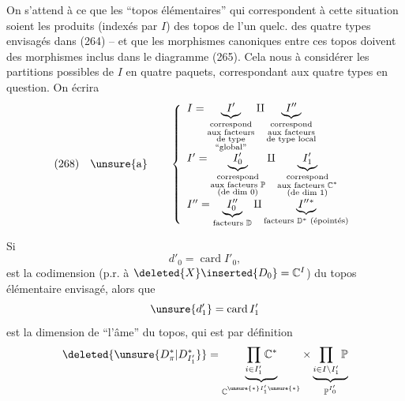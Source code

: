 On s'attend à ce que les ``topos élémentaires'' qui correspondent à cette situation soient les produits (indexés par $I$) des topos de l'un quelc. des quatre types envisagés dans (264) -- et que les morphismes canoniques entre ces topos doivent  des morphismes inclus dans le diagramme (265). Cela nous  à considérer les partitions possibles de $I$ en quatre paquets, correspondant aux quatre types en question. On écrira
\[
(268)\quad\unsure{\mathrm{a}}\qquad
\left\{\begin{array}{l}
I=\underbrace{I'}_{\substack{\text{correspond}\\\text{aux facteurs}\\\text{de type}\\\text{``global''}}}\amalg
\underbrace{I''}_{\substack{\text{correspond}\\\text{aux facteurs}\\\text{de type local}}}\\[3em]
I'=\underbrace{I'_0}_{\substack{\text{correspond}\\\text{aux facteurs }\mathbb P\\\text{(de dim }0\text{)}}}\amalg
\underbrace{I'_1}_{\substack{\text{correspond}\\\text{aux facteurs }\mathbb C^*\\\text{(de dim }1\text{)}}}\\[3em]
I''=\underbrace{I''_0}_{\text{facteurs }\mathbb D}\amalg
\underbrace{I''{}^*}_{\text{facteurs }\mathbb D^*\text{ (épointés)}}
\end{array}\right.
\]

Si
\[
d'_0=\operatorname{card}I'_0,
\]
 est la codimension (p.r. à $\deleted{X}\inserted{D_0}=\mathbb C^I$) du topos élémentaire envisagé,  alors que
\[
\unsure{d'_1}=\operatorname{card}I'_1
\]
est la dimension de ``l'âme'' du topos, qui est par définition
\[
\deleted{\unsure{D_{\pi}^*|D_{I'_1}^*}}=
\underbrace{\prod_{i\in I'_1}\mathbb C^*}_{\mathbb C^{\unsure{*}I'_1\unsure{*}}}
\times
\underbrace{\prod_{i\in I\setminus I'_1}\mathbb P}_{\mathbb P^{I'_0}}
\]

